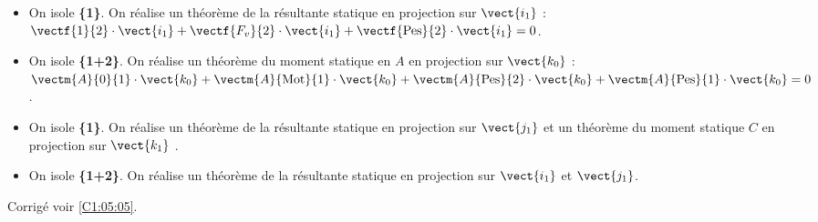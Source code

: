 \else
\fi

\ifprof

\begin{itemize}
\item On isole \textbf{\{1\}}. On réalise un théorème de la résultante statique en projection sur $\vect{i_1}$ :
$ \vectf{1}{2}\cdot \vect{i_1} + \vectf{F_v}{2}\cdot \vect{i_1} + \vectf{\text{Pes}}{2}\cdot \vect{i_1} = 0$.
\item On isole \textbf{\{1+2\}}. On réalise un théorème du moment statique en $A$ en projection sur $\vect{k_0}$ :
$ \vectm{A}{0}{1}\cdot \vect{k_0} 
+ \vectm{A}{\text{Mot}}{1}\cdot \vect{k_0} 
+ \vectm{A}{\text{Pes}}{2}\cdot \vect{k_0}
+ \vectm{A}{\text{Pes}}{1}\cdot \vect{k_0} = 0$.
\end{itemize}

\else
\fi


\ifprof

\begin{itemize}
\item On isole \textbf{\{1\}}. On réalise un théorème de la résultante statique en projection sur $\vect{j_1}$ 
et un théorème du moment statique $C$ en projection sur $\vect{k_1}$ .
\item On isole \textbf{\{1+2\}}. On réalise un théorème de la résultante statique en projection sur $\vect{i_1}$ et $\vect{j_1}$.
\end{itemize}
\else
\fi

\ifprof
\else
\begin{flushright}
\footnotesize{Corrigé  voir \ref{C1:05:05}.}
\end{flushright}%
\fi